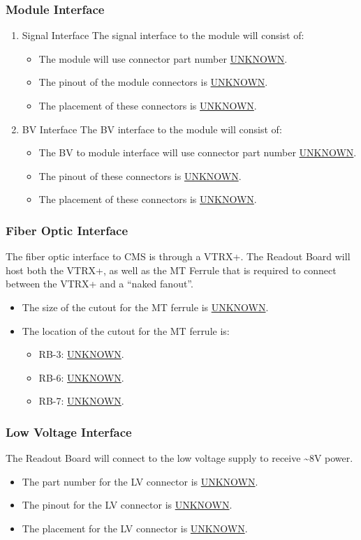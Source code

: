 \documentclass[11pt]{article}
\begin{document}
\subsubsection{Module Interface}
\label{sec:orgcd10888}
\begin{enumerate}
\item Signal Interface
\label{sec:orga338914}
The signal interface to the module will consist of:
\begin{itemize}
\item The module will use connector part number \uline{UNKNOWN}.
\item The pinout of the module connectors is \uline{UNKNOWN}.
\item The placement of these connectors is \uline{UNKNOWN}.
\end{itemize}
\item BV Interface
\label{sec:orgf995d80}
The BV interface to the module will consist of:
\begin{itemize}
\item The BV to module interface will use connector part number \uline{UNKNOWN}.
\item The pinout of these connectors is \uline{UNKNOWN}.
\item The placement of these connectors is \uline{UNKNOWN}.
\end{itemize}
\end{enumerate}
\subsubsection{Fiber Optic Interface}
\label{sec:orge6ac816}
The fiber optic interface to CMS is through a VTRX+. The Readout Board will host both the VTRX+, as well as the MT Ferrule that is required to connect between the VTRX+ and a ``naked fanout''.
\begin{itemize}
\item The size of the cutout for the MT ferrule is \uline{UNKNOWN}.
\item The location of the cutout for the MT ferrule is:
\begin{itemize}
\item RB-3: \uline{UNKNOWN}.
\item RB-6: \uline{UNKNOWN}.
\item RB-7: \uline{UNKNOWN}.
\end{itemize}
\end{itemize}
\subsubsection{Low Voltage Interface}
\label{sec:org3241f2e}
The Readout Board will connect to the low voltage supply to receive \textasciitilde{}8V power.
\begin{itemize}
\item The part number for the LV connector is \uline{UNKNOWN}.
\item The pinout for the LV connector is \uline{UNKNOWN}.
\item The placement for the LV connector is \uline{UNKNOWN}.
\end{itemize}
\end{document}
